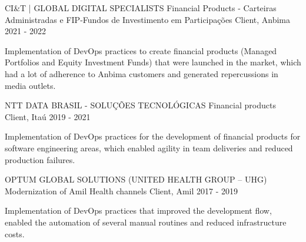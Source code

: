 

\begin{cventries}

  \cventry
    {CI\&T | GLOBAL DIGITAL SPECIALISTS} %
    {Financial Products - Carteiras Administradas e FIP-Fundos de Investimento em Participações} %
    {Client, Anbima} %
    {2021 - 2022} %
    {
      \begin{cvitems} %
        \item {Implementation of DevOps practices to create financial products (Managed Portfolios and Equity Investment Funds) that were launched in the market, which had a lot of adherence to Anbima customers and generated repercussions in media outlets.}
      \end{cvitems}
    }

  \cventry
    {NTT DATA BRASIL - SOLUÇÕES TECNOLÓGICAS} %
    {Financial products} %
    {Client, Itaú} %
    {2019 - 2021} %
    {
      \begin{cvitems} %
        \item {Implementation of DevOps practices for the development of financial products for software engineering areas, which enabled agility in team deliveries and reduced production failures.}
      \end{cvitems}
    }

  \cventry
    {OPTUM GLOBAL SOLUTIONS (UNITED HEALTH GROUP – UHG)} %
    {Modernization of Amil Health channels} %
    {Client, Amil} %
    {2017 - 2019} %
    {
      \begin{cvitems} %
        \item {Implementation of DevOps practices that improved the development flow, enabled the automation of several manual routines and reduced infrastructure costs.}
      \end{cvitems}
}

\end{cventries}
